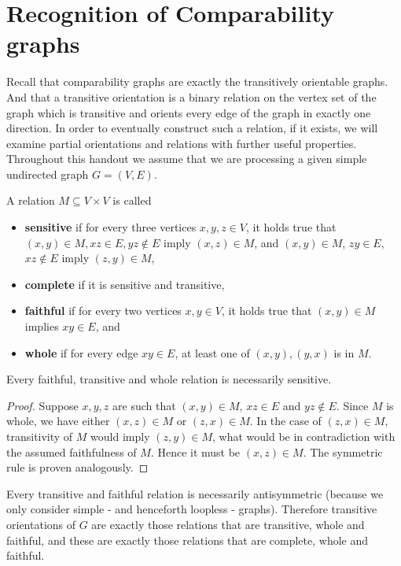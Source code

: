 \chapter{Recognition of Comparability graphs}

Recall that comparability graphs are exactly the transitively orientable graphs. And that a transitive orientation is a binary relation on the vertex set of the graph which is transitive and orients every edge of the graph in exactly one direction. In order to eventually construct such a relation, if it exists, we will examine partial orientations and relations with further useful properties. Throughout
this handout we assume that we are processing a given simple undirected graph $G = (V, E)$.

\begin{defn}
	A relation $M \subseteq V \times V$ is called
	
	\begin{itemize}
		\item \textbf{sensitive} if for every three vertices $x, y, z \in V$, it holds true that $(x, y) \in M, xz \in E, yz \notin E$ imply $(x, z) \in M$, and $(x, y) \in M$, $zy \in E$, $xz \notin E$ imply $(z, y) \in M$,
		\item \textbf{complete} if it is sensitive and transitive,
		\item \textbf{faithful} if for every two vertices $x, y \in V$, it holds true that $(x, y) \in M$ implies $xy \in E$, and
		\item \textbf{whole} if for every edge $xy \in E$, at least one of $(x, y), (y, x)$ is in $M$.
	\end{itemize}
\end{defn}

\begin{observ}
	Every faithful, transitive and whole relation is necessarily sensitive.
\end{observ}

\begin{proof}
	Suppose $x, y, z$ are such that $(x, y) \in M$, $xz \in E$ and $yz \notin E$. Since $M$ is whole, we have either $(x, z) \in M$ or $(z, x) \in M$. In the case of $(z, x) \in M$, transitivity of $M$ would imply $(z, y) \in M$,	what would be in contradiction with the assumed faithfulness of $M$. Hence it must be $(x, z) \in M$. The symmetric rule is proven analogously.
\end{proof}

\begin{observ}
	Every transitive and faithful relation is necessarily antisymmetric (because we only consider simple - and henceforth loopless - graphs). Therefore transitive \\ orientations of $G$ are exactly those relations that are transitive, whole and faithful, and these are exactly those relations that are complete, whole and faithful.
\end{observ}

